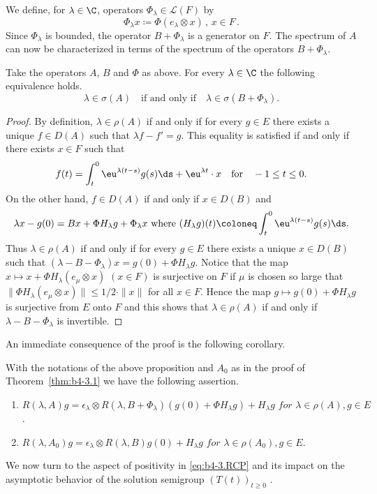 We define, for $\lambda \in \C$, operators $\Phi_\lambda \in \mathcal{L}(F)$ by
\begin{equation}\label{eq:b4-3.3}
	\Phi_\lambda x  \coloneq  \Phi(e_\lambda \otimes x) \, , \, x \in F \, .
\end{equation}
Since $\Phi_\lambda$ is bounded, the operator $B + \Phi_\lambda$ is a generator on $F$. 
The spectrum of\/ $A$ can now be characterized in terms of the spectrum of the operators $B + \Phi_\lambda$.
\begin{proposition}\label{prop:b4-3.4}
	Take the operators $A$, $B$ and $\Phi$ as above. 
    For every $\lambda \in \C$ the following equivalence holds. 
	\begin{equation}\label{eq:b4-3.4}
		\lambda \in \sigma(A) \quad \text{if and only if} \quad \lambda \in \sigma(B + \Phi_\lambda).
	\end{equation}
\end{proposition}
\begin{proof} By definition, $\lambda \in \rho(A)$ if and only if for every $g \in E$ there exists a unique $f \in D(A)$ such that $\lambda f - f' = g$. 
This equality is satisfied if and only if there exists $x \in F$ such that
\[
f(t) = \int_t^0 \eu^{\lambda(t-s)} g(s)  \ds  + \eu^{\lambda t} \cdot x \quad \text{for} \quad -1 \leq t \leq 0   .
\]
On the other hand, $f \in D(A)$ if and only if\/ $x \in D(B)$ and
\[
\text{$\lambda x - g(0) = Bx + \Phi H_\lambda g + \Phi_\lambda x$ where $(H_\lambda g)(t) \coloneq  \int_t^0 \eu^{\lambda(t-s)} g(s)  \ds  .$}
\]
Thus $\lambda \in \rho(A)$ if and only if for every $g \in E$ there exists a unique $x \in D(B)$ such that $(\lambda - B - \Phi_\lambda)x = g(0) + \Phi H_\lambda g$. 
Notice that the map $x \mapsto x + \Phi H_\lambda(e_\mu \otimes x)$ $(x \in F)$ is surjective on $F$ if\/ $\mu$ is chosen so large that $\|\Phi H_\lambda(e_\mu \otimes x)\| \leq 1/2 \cdot \|x\|$ for all $x \in F$. 
Hence the map $g \mapsto g(0) + \Phi H_\lambda g$ is surjective from $E$ onto $F$ and this shows that $\lambda \in \rho(A)$ if and only if\/ $\lambda - B - \Phi_\lambda$ is invertible.
\end{proof}
An immediate consequence of the proof is the following corollary.
\begin{corollary*}
With the notations of the above proposition and $A_{0}$ as in the proof of Theorem~\ref{thm:b4-3.1} we have the following assertion.
\begin{enumerate}[\upshape (i)]
	\item  
	$R(\lambda,A)g = \epsilon_\lambda \otimes R(\lambda,B+\Phi_\lambda)(g(0)+\Phi H_\lambda g) + H_\lambda g \textit{ for } \lambda \in \rho(A), g \in E$.

	\item 
	$R(\lambda,A_{0})g = \epsilon_\lambda \otimes R(\lambda,B)g(0) + H_\lambda g \textit{ for }  \lambda \in \rho(A_{0}), g \in E$.
\end{enumerate}
\end{corollary*}
We now turn to the aspect of positivity in \eqref{eq:b4-3.RCP} and its impact on the asymptotic behavior of the solution semigroup $(T(t))_{t \geq 0}$ .

